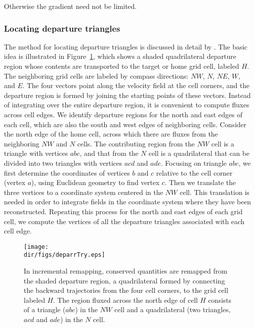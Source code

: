 \noindent
Otherwise the gradient need not be limited.

\subsubsection{Locating departure triangles}
\label{sc:glissade-IR-departure} 

The method for locating departure triangles is discussed in detail by 
\citet{Dukowicz2000}. The basic idea is illustrated in Figure~\ref{fig:gliss.deparr}, 
which shows a shaded quadrilateral departure region whose contents are transported to
the target or home grid cell, labeled $H$. The neighboring grid
cells are labeled by compass directions: $NW$, $N$, $NE$, $W$, and
$E$.  The four vectors point along the velocity field at the cell
corners, and the departure region is formed by joining the
starting points of these vectors.  Instead of integrating over the
entire departure region, it is convenient to compute fluxes across
cell edges.  We identify departure regions for the north and east
edges of each cell, which are also the south and west edges of
neighboring cells. Consider the north edge of the home cell,
across which there are fluxes from the neighboring $NW$ and $N$
cells. The contributing region from the $NW$ cell is a triangle
with vertices $abc$, and that from the $N$ cell is a quadrilateral
that can be divided into two triangles with vertices $acd$ and
$ade$. Focusing on triangle $abc$, we first determine the
coordinates of vertices $b$ and $c$ relative to the cell corner
(vertex $a$), using Euclidean geometry to find vertex $c$. Then we
translate the three vertices to a coordinate system centered in
the $NW$ cell.  This translation is needed in order to integrate
fields in the coordinate system where they have been reconstructed.
Repeating this process for the north and east edges of each grid cell, we compute the
vertices of all the departure triangles associated with each cell
edge.



\begin{figure}
  \begin{center}
     \texttt{[image: \\dir/figs/deparrTry.eps]}
  \end{center}
  \caption{In incremental remapping, conserved quantities are remapped from the shaded departure region, a quadrilateral formed by connecting the backward trajectories from the four cell corners, to the grid cell labeled $H$. The region fluxed across the north edge of cell $H$ consists of a triangle ($abc$) in the $NW$ cell and a quadrilateral (two triangles, $acd$ and $ade$) in the $N$ cell.}
  \label{fig:gliss.deparr}
\end{figure}



